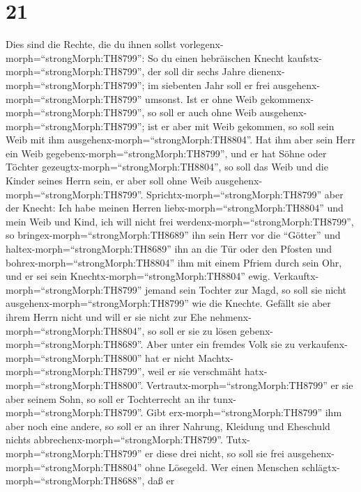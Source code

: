 \hypertarget{section-20}{%
\section{21}\label{section-20}}

 Dies sind die Rechte, die du ihnen sollst
vorlegenx-morph=``strongMorph:TH8799'':  So du einen
hebräischen Knecht kaufstx-morph=``strongMorph:TH8799'', der soll dir
sechs Jahre dienenx-morph=``strongMorph:TH8799''; im siebenten Jahr soll
er frei ausgehenx-morph=``strongMorph:TH8799'' umsonst.  Ist
er ohne Weib gekommenx-morph=``strongMorph:TH8799'', so soll er auch
ohne Weib ausgehenx-morph=``strongMorph:TH8799''; ist er aber mit Weib
gekommen, so soll sein Weib mit ihm
ausgehenx-morph=``strongMorph:TH8804''.  Hat ihm aber sein
Herr ein Weib gegebenx-morph=``strongMorph:TH8799'', und er hat Söhne
oder Töchter gezeugtx-morph=``strongMorph:TH8804'', so soll das Weib und
die Kinder seines Herrn sein, er aber soll ohne Weib
ausgehenx-morph=``strongMorph:TH8799''. 
Sprichtx-morph=``strongMorph:TH8799'' aber der Knecht: Ich habe meinen
Herren liebx-morph=``strongMorph:TH8804'' und mein Weib und Kind, ich
will nicht frei werdenx-morph=``strongMorph:TH8799'',  so
bringex-morph=``strongMorph:TH8689'' ihn sein Herr vor die ``Götter''
und haltex-morph=``strongMorph:TH8689'' ihn an die Tür oder den Pfosten
und bohrex-morph=``strongMorph:TH8804'' ihm mit einem Pfriem durch sein
Ohr, und er sei sein Knechtx-morph=``strongMorph:TH8804'' ewig.
 Verkauftx-morph=``strongMorph:TH8799'' jemand sein Tochter
zur Magd, so soll sie nicht ausgehenx-morph=``strongMorph:TH8799'' wie
die Knechte.  Gefällt sie aber ihrem Herrn nicht und will er
sie nicht zur Ehe nehmenx-morph=``strongMorph:TH8804'', so soll er sie
zu lösen gebenx-morph=``strongMorph:TH8689''. Aber unter ein fremdes
Volk sie zu verkaufenx-morph=``strongMorph:TH8800'' hat er nicht
Machtx-morph=``strongMorph:TH8799'', weil er sie verschmäht
hatx-morph=``strongMorph:TH8800''. 
Vertrautx-morph=``strongMorph:TH8799'' er sie aber seinem Sohn, so soll
er Tochterrecht an ihr tunx-morph=``strongMorph:TH8799''. 
Gibt erx-morph=``strongMorph:TH8799'' ihm aber noch eine andere, so soll
er an ihrer Nahrung, Kleidung und Eheschuld nichts
abbrechenx-morph=``strongMorph:TH8799''. 
Tutx-morph=``strongMorph:TH8799'' er diese drei nicht, so soll sie frei
ausgehenx-morph=``strongMorph:TH8804'' ohne Lösegeld.  Wer
einen Menschen schlägtx-morph=``strongMorph:TH8688'', daß er
